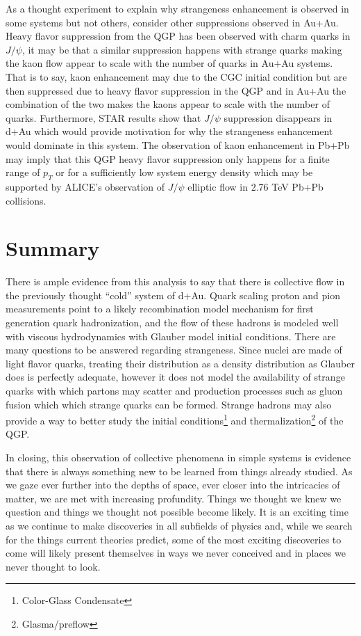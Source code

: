 As a thought experiment to explain why strangeness enhancement is observed in some systems but not others, consider other suppressions observed in Au+Au. Heavy flavor suppression from the QGP has been observed with charm quarks in $J/\psi$, it may be that a similar suppression happens with strange quarks making the kaon flow appear to scale with the number of quarks in Au+Au systems. That is to say, kaon enhancement may due to the CGC initial condition but are then suppressed due to heavy flavor suppression in the QGP and in Au+Au the combination of the two makes the kaons appear to scale with the number of quarks. Furthermore, STAR results show that $J/\psi$ suppression disappears in d+Au\citep{Powell:2010oea} which would provide motivation for why the strangeness enhancement would dominate in this system. The observation of kaon enhancement in Pb+Pb may imply that this QGP heavy flavor suppression only happens for a finite range of $p_T$ or for a sufficiently low system energy density which may be supported by ALICE's observation of $J/\psi$ elliptic flow in 2.76 TeV Pb+Pb collisions\citep{ALICE:2013xna}.

\section{Summary}
There is ample evidence from this analysis to say that there is collective flow in the previously thought ``cold'' system of d+Au. Quark scaling proton and pion measurements point to a likely recombination model mechanism for first generation quark hadronization, and the flow of these hadrons is modeled well with viscous hydrodynamics with Glauber model initial conditions. There are many questions to be answered regarding strangeness. Since nuclei are made of light flavor quarks, treating their distribution as a density distribution as Glauber does is perfectly adequate, however it does not model the availability of strange quarks with which partons may scatter and production processes such as gluon fusion which which strange quarks can be formed. Strange hadrons may also provide a way to better study the initial conditions\footnote{Color-Glass Condensate} and thermalization\footnote{Glasma/preflow} of the QGP. 

In closing, this observation of collective phenomena in simple systems is evidence that there is always something new to be learned from things already studied. As we gaze ever further into the depths of space, ever closer into the intricacies of matter, we are met with increasing profundity. Things we thought we knew we question and things we thought not possible become likely. It is an exciting time as we continue to make discoveries in all subfields of physics and, while we search for the things current theories predict, some of the most exciting discoveries to come will likely present themselves in ways we never conceived and in places we never thought to look. 

\pagebreak
\pagebreak


